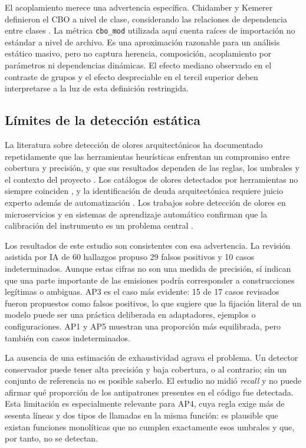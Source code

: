 El acoplamiento merece una advertencia específica. Chidamber y Kemerer definieron el CBO a nivel de clase, considerando las relaciones de dependencia entre clases \cite{chidamber_metrics_1994}. La métrica \texttt{cbo\_mod} utilizada aquí cuenta raíces de importación no estándar a nivel de archivo. Es una aproximación razonable para un análisis estático masivo, pero no captura herencia, composición, acoplamiento por parámetros ni dependencias dinámicas. El efecto mediano observado en el contraste de grupos y el efecto despreciable en el tercil superior deben interpretarse a la luz de esta definición restringida.

\subsection{Límites de la detección estática}

La literatura sobre detección de olores arquitectónicos ha documentado repetidamente que las herramientas heurísticas enfrentan un compromiso entre cobertura y precisión, y que sus resultados dependen de las reglas, los umbrales y el contexto del proyecto \cite{martini_identifying_2018,fontana_arcan_2017,mumtaz_systematic_2021}. Los catálogos de olores detectados por herramientas no siempre coinciden \cite{azadi_architectural_2019}, y la identificación de deuda arquitectónica requiere juicio experto además de automatización \cite{verdecchia_architectural_2018,de_toledo_identifying_2021}. Los trabajos sobre detección de olores en microservicios y en sistemas de aprendizaje automático confirman que la calibración del instrumento es un problema central \cite{pigazzini_towards_2020,gesi_code_2022}.

Los resultados de este estudio son consistentes con esa advertencia. La revisión asistida por IA de 60 hallazgos propuso 29 falsos positivos y 10 casos indeterminados. Aunque estas cifras no son una medida de precisión, sí indican que una parte importante de las emisiones podría corresponder a construcciones legítimas o ambiguas. AP3 es el caso más evidente: 15 de 17 casos revisados fueron propuestos como falsos positivos, lo que sugiere que la fijación literal de un modelo puede ser una práctica deliberada en adaptadores, ejemplos o configuraciones. AP1 y AP5 muestran una proporción más equilibrada, pero también con casos indeterminados.

La ausencia de una estimación de exhaustividad agrava el problema. Un detector conservador puede tener alta precisión y baja cobertura, o al contrario; sin un conjunto de referencia no es posible saberlo. El estudio no midió \emph{recall} y no puede afirmar qué proporción de los antipatrones presentes en el código fue detectada. Esta limitación es especialmente relevante para AP4, cuya regla exige más de sesenta líneas y dos tipos de llamadas en la misma función: es plausible que existan funciones monolíticas que no cumplen exactamente esos umbrales y que, por tanto, no se detectan.

